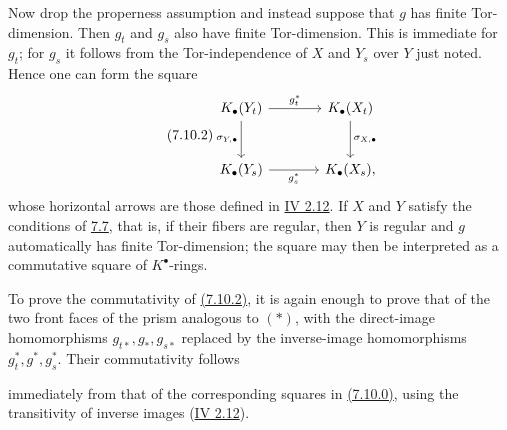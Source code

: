 Now drop the properness assumption and instead suppose that $g$ has finite
Tor-dimension. Then $g_t$ and $g_s$ also have finite Tor-dimension. This is
immediate for $g_t$; for $g_s$ it follows from the Tor-independence of
$X$ and $Y_s$ over $Y$ just noted. Hence one can form the square
\begin{equation}\tag{7.10.2}
\begin{tikzcd}[column sep=large,row sep=large]
K_\bullet(Y_t) \arrow[r,"g_t^*"] \arrow[d,"\sigma_{Y,\bullet}"'] &
K_\bullet(X_t) \arrow[d,"\sigma_{X,\bullet}"]\\
K_\bullet(Y_s) \arrow[r,"g_s^*"'] & K_\bullet(X_s),
\end{tikzcd}
\end{equation}
whose horizontal arrows are those defined in \hyperlink{sga6.e04.para.2-12}{IV 2.12}. If $X$ and $Y$
satisfy the conditions of \hyperlink{sga6.e10.sec.7.7}{7.7}, that is, if their fibers are regular, then
$Y$ is regular and $g$ automatically has finite Tor-dimension; the square
may then be interpreted as a commutative square of $K^\bullet$-rings.

To prove the commutativity of \hyperlink{sga6.e10.eq.7-10-2}{(7.10.2)}, it is again enough to prove that of
the two front faces of the prism analogous to $(*)$, with the direct-image
homomorphisms $g_{t*},g_*,g_{s*}$ replaced by the inverse-image
homomorphisms $g_t^*,g^*,g_s^*$. Their commutativity follows

immediately from that of the corresponding squares in \hyperlink{sga6.e10.eq.7-10-0}{(7.10.0)}, using the
transitivity of inverse images (\hyperlink{sga6.e04.para.2-12}{IV 2.12}).

